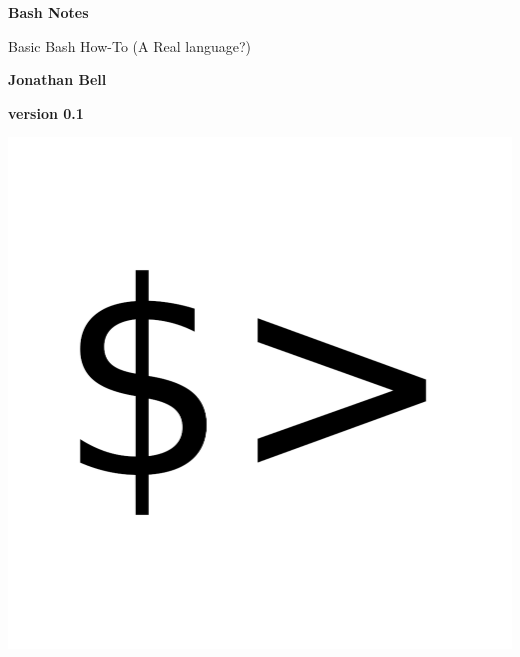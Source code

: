 \documentclass[22pt] {article}
\begin{document}
\begin{center}
		\vspace*{1cm}
		\Huge
		\textbf{Bash Notes}
		\Large
		
		\vspace{0.5cm}
		Basic Bash How-To (A Real language?)
		
		\vspace{1.5cm}
		
		\textbf{Jonathan Bell}
		\vspace{1.5cm}
		
		\textbf{version 0.1}
		
		\vspace{4.2cm}
		\includegraphics[scale=1,bb= 150 100 30 30]{bash.png}
				
\end{center}
\pagebreak

	\Huge
\end{document}
